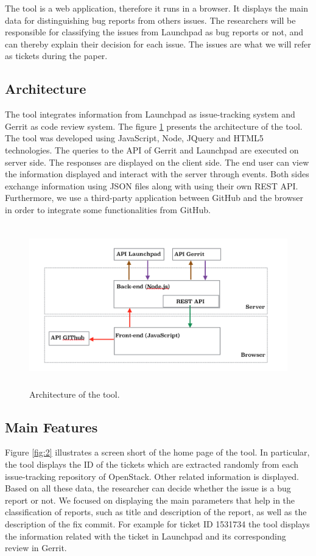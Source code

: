 \documentclass[runningheads,a4paper]{llncs}
\begin{document}
The tool is a web application, therefore it runs in a browser. It displays the main data for distinguishing bug reports from others issues. The researchers will be responsible for classifying the issues from Launchpad as bug reports or not, and can thereby explain their decision for each issue. The issues are what we will refer as tickets during the paper.


\subsection{Architecture}

The tool integrates information from Launchpad as issue-tracking system and Gerrit as code review system. The figure \ref{fig:1} presents the architecture of the tool. The tool was developed using JavaScript, Node, JQuery and HTML5 technologies. The queries to the API of Gerrit and Launchpad are executed on server side. The responses are displayed on the client side. The end user can view the information displayed and interact with the server through events. Both sides exchange information using JSON files along with using their own REST API. Furthermore, we use a third-party application between GitHub and the browser in order to integrate some functionalities from GitHub.

\label{sec:2.1}
\begin{figure}
\centering
\includegraphics[height=7cm]{Arquitectura.png}
\caption{Architecture of the tool.}
\label{fig:1}       %
\end{figure}

\subsection{Main Features}
\label{sec:2.2}
Figure \ref{fig:2} illustrates a screen short of the home page of the tool. In particular, the tool displays the ID of the tickets which are extracted randomly from each issue-tracking repository of OpenStack. Other related information is displayed. Based on all these data, the researcher can decide whether the issue is a bug report or not. We focused on displaying the main parameters that help in the classification of reports, such as title and description of the report, as well as the description of the fix commit. For example for ticket ID 1531734 the tool displays the information related with the ticket in Launchpad and its corresponding review in Gerrit.
\end{document}
